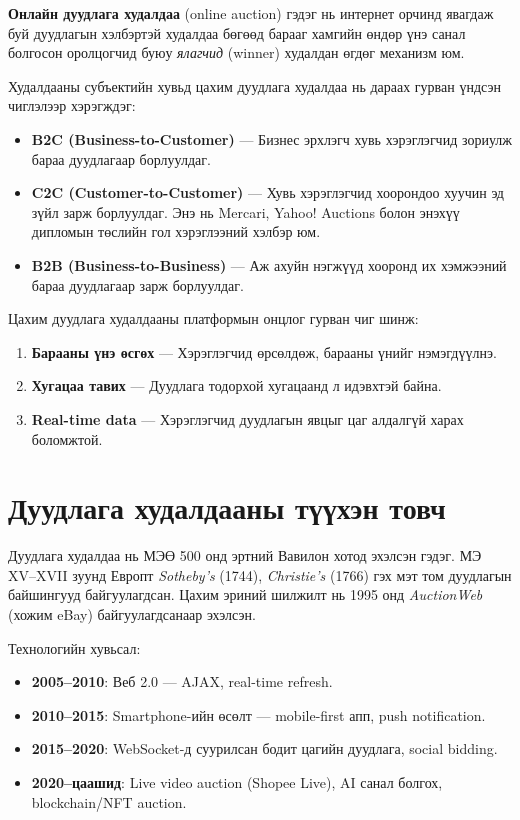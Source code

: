 \documentclass[12pt, a4paper]{report}
\begin{document}
\textbf{Онлайн дуудлага худалдаа} (online auction) гэдэг нь интернет орчинд явагдаж буй дуудлагын хэлбэртэй худалдаа бөгөөд барааг хамгийн өндөр үнэ санал болгосон оролцогчид буюу \textit{ялагчид} (winner) худалдан өгдөг механизм юм.

Худалдааны субъектийн хувьд цахим дуудлага худалдаа нь дараах гурван үндсэн чиглэлээр хэрэгждэг:

\begin{itemize}
  \item \textbf{B2C (Business-to-Customer)} — Бизнес эрхлэгч хувь хэрэглэгчид зориулж бараа дуудлагаар борлуулдаг.
  \item \textbf{C2C (Customer-to-Customer)} — Хувь хэрэглэгчид хоорондоо хуучин эд зүйл зарж борлуулдаг. Энэ нь Mercari, Yahoo! Auctions болон энэхүү дипломын төслийн гол хэрэглээний хэлбэр юм.
  \item \textbf{B2B (Business-to-Business)} — Аж ахуйн нэгжүүд хооронд их хэмжээний бараа дуудлагаар зарж борлуулдаг.
\end{itemize}

Цахим дуудлага худалдааны платформын онцлог гурван чиг шинж:
\begin{enumerate}
  \item \textbf{Барааны үнэ өсгөх} — Хэрэглэгчид өрсөлдөж, барааны үнийг нэмэгдүүлнэ.
  \item \textbf{Хугацаа тавих} — Дуудлага тодорхой хугацаанд л идэвхтэй байна.
  \item \textbf{Real-time data} — Хэрэглэгчид дуудлагын явцыг цаг алдалгүй харах боломжтой.
\end{enumerate}

\section{Дуудлага худалдааны түүхэн товч}

Дуудлага худалдаа нь МЭӨ 500 онд эртний Вавилон хотод эхэлсэн гэдэг. МЭ XV--XVII зуунд Европт \textit{Sotheby's} (1744), \textit{Christie's} (1766) гэх мэт том дуудлагын байшингууд байгуулагдсан. Цахим эриний шилжилт нь 1995 онд \textit{AuctionWeb} (хожим eBay) байгуулагдсанаар эхэлсэн.

Технологийн хувьсал:
\begin{itemize}
  \item \textbf{2005--2010}: Веб 2.0 — AJAX, real-time refresh.
  \item \textbf{2010--2015}: Smartphone-ийн өсөлт — mobile-first апп, push notification.
  \item \textbf{2015--2020}: WebSocket-д суурилсан бодит цагийн дуудлага, social bidding.
  \item \textbf{2020--цаашид}: Live video auction (Shopee Live), AI санал болгох, blockchain/NFT auction.
\end{itemize}
\end{document}
